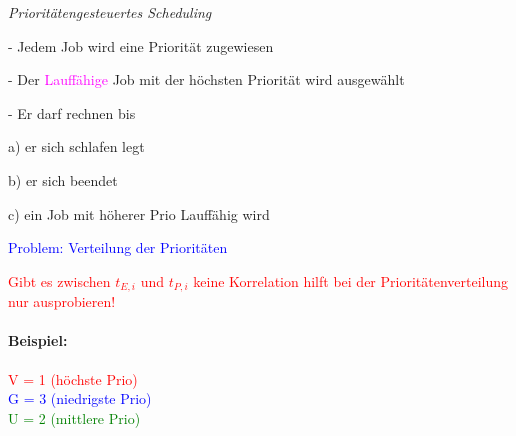\documentclass[12pt,a4paper,oneside,ngerman]{article}
\begin{document}
\emph{Prioritätengesteuertes Scheduling}
\begin{description}
	\item - Jedem Job wird eine Priorität zugewiesen
	\item - Der \textcolor{magenta}{Lauffähige} Job mit der höchsten Priorität wird ausgewählt
	\item - Er darf rechnen bis
	\begin{description}
		\item a) er sich schlafen legt
		\item b) er sich beendet
		\item c) ein Job mit höherer Prio Lauffähig wird
	\end{description}
\end{description}
\textcolor{blue}{Problem: Verteilung der Prioritäten}


\textcolor{red}{Gibt es zwischen \(t_{E,i}\) und \(t_{P,i}\) keine Korrelation hilft bei der Prioritätenverteilung nur ausprobieren!} \\

\paragraph{Beispiel:}
	\textcolor{red}{V = 1 (höchste Prio)} \\
	\textcolor{blue}{G = 3 (niedrigste Prio)} \\
	\textcolor{green}{U = 2 (mittlere Prio)} \\
\end{document}
